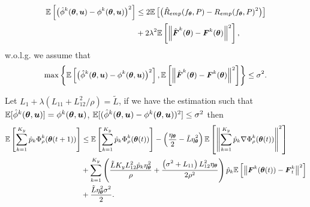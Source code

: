 \begin{equation}
	\small
	\begin{aligned}
	\mE\left[\left(\hat{\phi}^{k}(\btheta, \bu) - \phi^{k}(\btheta, \bu)\right)^{2}\right] & \leq 2\mE\left[\left(\hat{R}_{emp}(f_{\btheta}, P) - R_{emp}(f_{\btheta}, P)^{2}\right)\right] \\
	& + 2\lambda^{2}\mE\left[\left\|\hat{\bF}^{k}(\btheta) - \bF^{k}(\btheta)\right\|^{2}\right],
	\end{aligned}
\end{equation}
w.o.l.g. we assume that 
\begin{equation}
	\small
	\max\left\{\mE\left[\left(\hat{\phi}^{k}(\btheta, \bu) - \phi^{k}(\btheta, \bu)\right)^{2}\right], \mE\left[\left\|\hat{\bF}^{k}(\btheta) - \bF^{k}(\btheta)\right\|^{2}\right]\right\} \leq \sigma^{2}.
\end{equation}
\begin{lemma}\label{lem:descent lemma}
	Let $L_{1} + \lambda\left(L_{11} + L_{12}^{2}/\rho\right) = \tilde{L}$, if we have the estimation such that $\mathbb{E}[\hat{\phi}^{k}(\text{\boldmath{$\theta$}}, \boldsymbol{u})] = \phi^{k}(\text{\boldmath{$\theta$}}, \boldsymbol{u})$,  $\mathbb{E}[(\hat{\phi}^{k}(\text{\boldmath{$\theta$}}, \boldsymbol{u}) - \phi^{k}(\text{\boldmath{$\theta$}}, \boldsymbol{u}))^{2}]\leq \sigma^{2}$ then
	\begin{equation}\label{eq:descent eq}
		\small
		\begin{aligned}
			\mE\left[\sum\limits_{k=1}^{K_{y}}\hat{p}_{k}\Phi_{\rho}^{k}(\btheta(t + 1))\right] & \leq \mE\left[\sum\limits_{k=1}^{K_{y}}\hat{p}_{k}\Phi_{\rho}^{k}(\btheta(t))\right] - \left(\frac{\eta_{\btheta}}{2} - \tilde{L}\eta_{\btheta}^{2}\right)\mE\left[\left\|\sum\limits_{k=1}^{K_{y}}\hat{p}_{k}\nabla\Phi_{\rho}^{k}(\btheta(t))\right\|^{2}\right] \\
			& + \sum\limits_{k=1}^{K_{y}}\left(\frac{\tilde{L}K_{y}L_{12}^{2}\hat{p}_{k}\eta_{\btheta}^{2}}{\rho} + \frac{\left(\sigma^{2} + L_{11}\right)L_{12}^{2}\eta_{\btheta}}{2\rho^{2}}\right)\hat{p}_{k}\mE\left[\left\|\bF^{k}(\btheta(t)) - \bF_{t}^{k}\right\|^{2}\right] \\
			& + \frac{\tilde{L}\eta_{\btheta}^{2}\sigma^{2}}{2}.
		\end{aligned}
	\end{equation}
\end{lemma}
